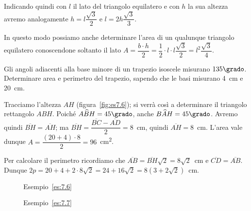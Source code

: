 Indicando quindi con $l$ il lato del triangolo equilatero e con $h$ 
la sua altezza avremo analogamente $h=l\dfrac{\sqrt{3}}{2}$ e 
$l=2h\dfrac{\sqrt{3}}{3}$.

In questo modo possiamo anche determinare l'area di un qualunque 
triangolo equilatero conoscendone soltanto il lato $A=\dfrac{b\cdot 
h}{2}=\dfrac{1}{2}\cdot l\cdot 
l\dfrac{\sqrt{3}}{2}=l^2\dfrac{\sqrt{3}}{4}$.

\begin{esempio}\label{es:7.6}
Gli angoli adiacenti alla base minore di un trapezio isoscele 
misurano $135\grado$. Determinare area e perimetro del trapezio, 
sapendo che le basi misurano 4~cm e 20~cm.\vspace{7pt}

Tracciamo l'altezza $AH$ (figura~\ref{fig:es7.6}); si verrà così a 
determinare il triangolo rettangolo $ABH$. Poiché 
$A\widehat{B}H=45\grado$, anche $B\widehat{A}H=45\grado$. Avremo 
quindi $\overline{BH}=\overline{AH}$; ma 
$\overline{BH}=\dfrac{\overline{BC}-\overline{AD}}{2}=8$~cm, quindi 
$\overline{AH}=8$~cm. L'area vale dunque $A=\dfrac{(20+4)\cdot 
8}{2}=96$~cm\textsuperscript{2}.

Per calcolare il perimetro ricordiamo che 
$\overline{AB}=\overline{BH}\sqrt{2}=8\sqrt{2}$~cm e 
$\overline{CD}=\overline{AB}$.
Dunque $2p=20+4+2\cdot 8\sqrt{2}=24+16\sqrt{2}=8(3+2\sqrt{2})$~cm.
\end{esempio}


\begin{inaccessibleblock}
 \begin{figure}[!htb]
  \begin{center}
    \begin{minipage}{0.45\textwidth}
      \centering
      
      
\caption{Esempio~\ref{es:7.6}}\label{fig:es7.6}
    \end{minipage}
    \hspace{0.03\textwidth}  
    \begin{minipage}{0.45\textwidth}
      \centering
      
      
\caption{Esempio~\ref{es:7.7}}\label{fig:es7.7}
    \end{minipage}
  \end{center}
\end{figure}
\end{inaccessibleblock}


